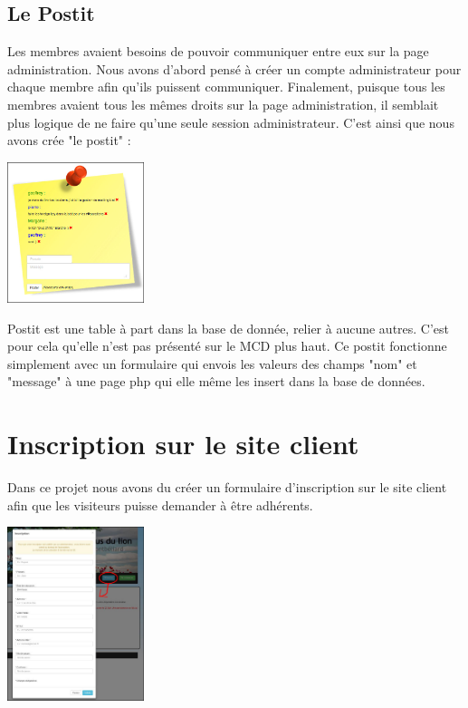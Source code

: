 \documentclass[11pt,a4paper,titlepage]{report}
\begin{document}
\subsection{Le Postit}
Les membres avaient besoins de pouvoir communiquer entre eux sur la page administration. Nous avons d'abord pensé à créer un compte administrateur pour chaque membre afin qu'ils puissent communiquer. Finalement, puisque tous les membres avaient tous les mêmes droits sur la page administration, il semblait plus logique de ne faire qu'une seule session administrateur. C'est ainsi que nous avons crée "le postit" :   
\begin{center}
\includegraphics[width=0.3\textwidth]{postit.jpg}~
\end{center}

Postit est une table à part dans la base de donnée, relier à aucune autres. C'est pour cela qu'elle n'est pas présenté sur le MCD plus haut.
Ce postit fonctionne simplement avec un formulaire qui envois les valeurs des champs "nom" et "message" à une page php qui elle même les insert dans la base de données. 

\section{Inscription sur le site client}
Dans ce projet nous avons du créer un formulaire d'inscription sur le site client afin que les visiteurs puisse demander à être adhérents. 

\begin{center}
\includegraphics[width=0.3\textwidth]{inscr.jpg}~
\end{center}
\end{document}
